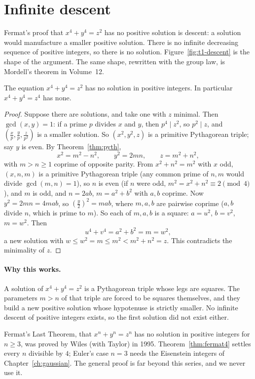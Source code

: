 \section{Infinite descent}

Fermat's proof that $x^4+y^4=z^2$ has no positive solution is descent: a solution would manufacture a smaller positive solution. There is no infinite decreasing sequence of positive integers, so there is no solution. Figure~\ref{fig:t1-descent} is the shape of the argument. The same shape, rewritten with the group law, is Mordell's theorem in Volume~12.

\begin{theorem}[Fermat]\label{thm:fermat4}
The equation $x^4+y^4=z^2$ has no solution in positive integers. In particular $x^4+y^4=z^4$ has none.
\end{theorem}
\begin{proof}
Suppose there are solutions, and take one with $z$ minimal. Then $\gcd(x,y)=1$: if a prime $p$ divides $x$ and $y$, then $p^4\mid z^2$, so $p^2\mid z$, and $\left(\frac xp,\frac yp,\frac z{p^2}\right)$ is a smaller solution. So $(x^2,y^2,z)$ is a primitive Pythagorean triple; say $y$ is even. By Theorem~\ref{thm:pyth},
\[
x^2=m^2-n^2,\qquad y^2=2mn,\qquad z=m^2+n^2,
\]
with $m>n\ge1$ coprime of opposite parity. From $x^2+n^2=m^2$ with $x$ odd, $(x,n,m)$ is a primitive Pythagorean triple (any common prime of $n,m$ would divide $\gcd(m,n)=1$), so $n$ is even (if $n$ were odd, $m^2=x^2+n^2\equiv2\pmod4$), and $m$ is odd, and $n=2ab$, $m=a^2+b^2$ with $a,b$ coprime. Now $y^2=2mn=4mab$, so $\left(\frac y2\right)^2=mab$, where $m,a,b$ are pairwise coprime ($a,b$ divide $n$, which is prime to $m$). So each of $m,a,b$ is a square: $a=u^2$, $b=v^2$, $m=w^2$. Then
\[
u^4+v^4=a^2+b^2=m=w^2,
\]
a new solution with $w\le w^2=m\le m^2<m^2+n^2=z$. This contradicts the minimality of $z$.
\end{proof}

\paragraph{Why this works.}
A solution of $x^4+y^4=z^2$ is a Pythagorean triple whose legs are squares. The parameters $m>n$ of that triple are forced to be squares themselves, and they build a new positive solution whose hypotenuse is strictly smaller. No infinite descent of positive integers exists, so the first solution did not exist either.

\begin{remark}
Fermat's Last Theorem, that $x^n+y^n=z^n$ has no solution in positive integers for $n\ge3$, was proved by Wiles (with Taylor) in 1995. Theorem~\ref{thm:fermat4} settles every $n$ divisible by $4$; Euler's case $n=3$ needs the Eisenstein integers of Chapter~\ref{ch:gaussian}. The general proof is far beyond this series, and we never use it.
\end{remark}

